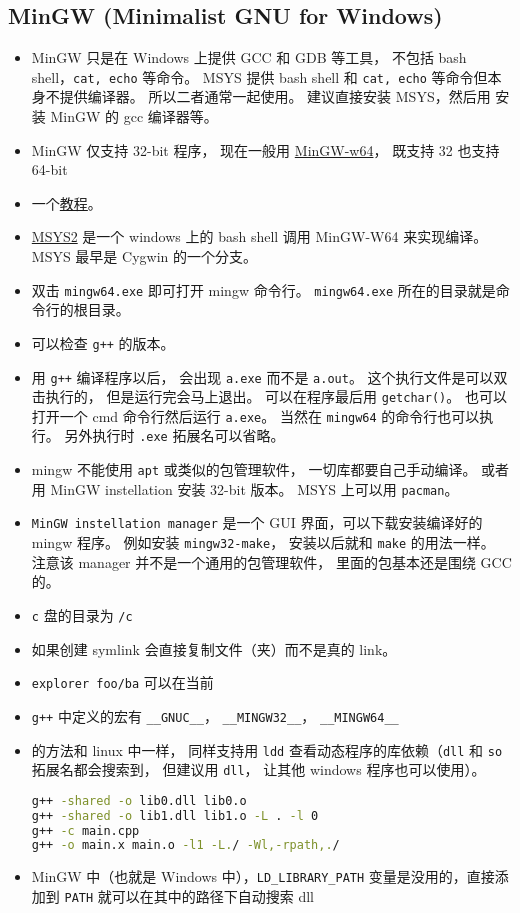 \subsection{MinGW (Minimalist GNU for Windows)}
\begin{itemize}
\item MinGW 只是在 Windows 上提供 GCC 和 GDB 等工具， 不包括 bash shell，\verb`cat, echo` 等命令。 MSYS 提供 bash shell 和 \verb`cat, echo` 等命令但本身不提供编译器。 所以二者通常一起使用。 建议直接安装 MSYS，然后用  安装 MinGW 的 gcc 编译器等。
\item MinGW 仅支持 32-bit 程序， 现在一般用 \href{https://www.mingw-w64.org/}{MinGW-w64}， 既支持 32 也支持 64-bit
\item 一个\href{https://www3.ntu.edu.sg/home/ehchua/programming/howto/Cygwin_HowTo.html}{教程}。
\item \href{https://www.msys2.org/}{MSYS2} 是一个 windows 上的 bash shell 调用 MinGW-W64 来实现编译。 MSYS 最早是 Cygwin 的一个分支。
\item 双击 \verb`mingw64.exe` 即可打开 mingw 命令行。 \verb`mingw64.exe` 所在的目录就是命令行的根目录。
\item 可以检查 \verb`g++` 的版本。
\item 用 \verb`g++` 编译程序以后， 会出现 \verb`a.exe` 而不是 \verb`a.out`。 这个执行文件是可以双击执行的， 但是运行完会马上退出。 可以在程序最后用 \verb`getchar()`。 也可以打开一个 cmd 命令行然后运行 \verb`a.exe`。 当然在 \verb`mingw64` 的命令行也可以执行。 另外执行时 \verb`.exe` 拓展名可以省略。
\item mingw 不能使用 \verb`apt` 或类似的包管理软件， 一切库都要自己手动编译。 或者用 MinGW instellation 安装 32-bit 版本。 MSYS 上可以用 \verb`pacman`。
\item \verb`MinGW instellation manager` 是一个 GUI 界面，可以下载安装编译好的 mingw 程序。 例如安装 \verb`mingw32-make`， 安装以后就和 \verb`make` 的用法一样。 注意该 manager 并不是一个通用的包管理软件， 里面的包基本还是围绕 GCC 的。
\item \verb`c` 盘的目录为 \verb`/c`
\item 如果创建 symlink 会直接复制文件（夹）而不是真的 link。
\item \verb`explorer foo/ba` 可以在当前
\item \verb`g++` 中定义的宏有 \verb`__GNUC__`， \verb`__MINGW32__`， \verb`__MINGW64__`
\item {}的方法和 linux 中一样， 同样支持用 \verb`ldd` 查看动态程序的库依赖（\verb`dll` 和 \verb`so` 拓展名都会搜索到， 但建议用 \verb`dll`， 让其他 windows 程序也可以使用）。
\begin{lstlisting}[language=bash]
g++ -shared -o lib0.dll lib0.o
g++ -shared -o lib1.dll lib1.o -L . -l 0
g++ -c main.cpp
g++ -o main.x main.o -l1 -L./ -Wl,-rpath,./
\end{lstlisting}
\item MinGW 中（也就是 Windows 中），\verb`LD_LIBRARY_PATH` 变量是没用的，直接添加到 \verb`PATH` 就可以在其中的路径下自动搜索 dll
\end{itemize}

